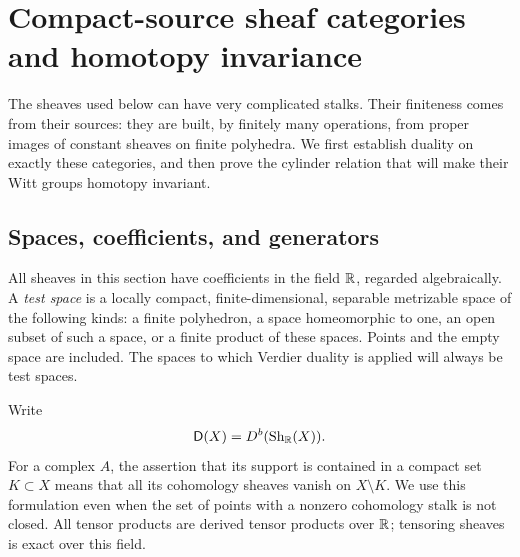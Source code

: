\section{Compact-source sheaf categories and homotopy invariance}
\label{sec:categories}

The sheaves used below can have very complicated stalks.  Their finiteness
comes from their sources: they are built, by finitely many operations, from
proper images of constant sheaves on finite polyhedra.  We first establish
duality on exactly these categories, and then prove the cylinder relation
that will make their Witt groups homotopy invariant.

\subsection{Spaces, coefficients, and generators}

All sheaves in this section have coefficients in the field $\mathbb R$, regarded
algebraically.  A \emph{test space} is a locally compact, finite-dimensional,
separable metrizable space of the following kinds: a finite polyhedron, a
space homeomorphic to one, an open subset of such a space, or a finite
product of these spaces.  Points and the empty space are included.  The
spaces to which Verdier duality is applied will always be test spaces.

Write
\[
 \mathsf D(X)=D^b(\operatorname{Sh}_{\mathbb R}(X)).
\]
For a complex $A$, the assertion that its support is contained in a compact
set $K\subset X$ means that all its cohomology sheaves vanish on $X\setminus
K$.  We use this formulation even when the set of points with a nonzero
cohomology stalk is not closed.  All tensor products are derived tensor
products over $\mathbb R$; tensoring sheaves is exact over this field.

